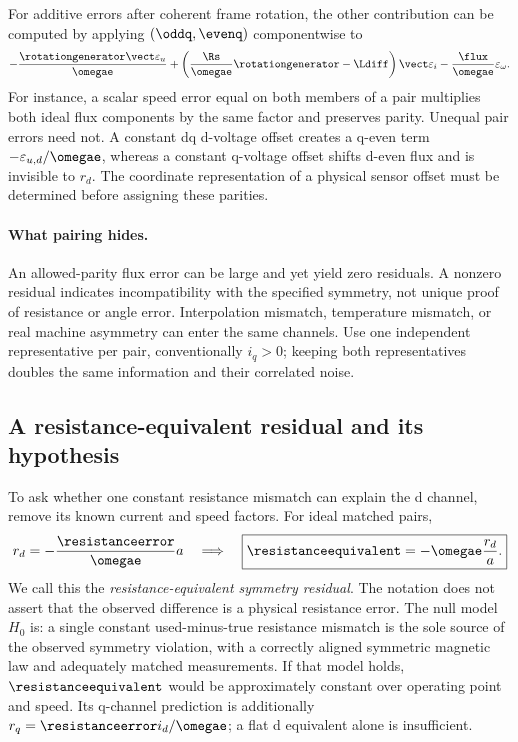 For additive errors after coherent frame rotation, the other contribution
can be computed by applying $(\oddq,\evenq)$ componentwise to
\begin{equation}
 -\frac{\rotationgenerator\vect\varepsilon_u}{\omegae}
 +\left(\frac{\Rs}{\omegae}\rotationgenerator-\Ldiff\right)\vect\varepsilon_i
 -\frac{\flux}{\omegae}\varepsilon_\omega.\label{eq:other-map}
\end{equation}
For instance, a scalar speed error equal on both members of a pair multiplies
both ideal flux components by the same factor and preserves parity. Unequal
pair errors need not. A constant dq d-voltage offset creates a q-even term
$-\varepsilon_{u,d}/\omegae$, whereas a constant q-voltage offset shifts
d-even flux and is invisible to $r_d$. The coordinate representation of a
physical sensor offset must be determined before assigning these parities.

\paragraph{What pairing hides.}
An allowed-parity flux error can be large and yet yield zero residuals.
A nonzero residual indicates incompatibility with the specified symmetry,
not unique proof of resistance or angle error. Interpolation mismatch,
temperature mismatch, or real machine asymmetry can enter the same channels.
Use one independent representative per pair, conventionally $i_q>0$; keeping
both representatives doubles the same information and their correlated noise.

\subsection{A resistance-equivalent residual and its hypothesis}
To ask whether one constant resistance mismatch can explain the d channel,
remove its known current and speed factors. For ideal matched pairs,
\begin{equation}
 r_d=-\frac{\resistanceerror}{\omegae}a
 \quad\Longrightarrow\quad
 \boxed{\resistanceequivalent=-\omegae\frac{r_d}{a}.}
 \label{eq:resistance-equivalent}
\end{equation}
We call this the \emph{resistance-equivalent symmetry residual}. The notation
does not assert that the observed difference is a physical resistance error.
The null model $H_0$ is: a single constant used-minus-true resistance mismatch
is the sole source of the observed symmetry violation, with a correctly
aligned symmetric magnetic law and adequately matched measurements.
If that model holds, $\resistanceequivalent$ would be approximately constant
over operating point and speed. Its q-channel prediction is additionally
$r_q=\resistanceerror i_d/\omegae$; a flat d equivalent alone is insufficient.

